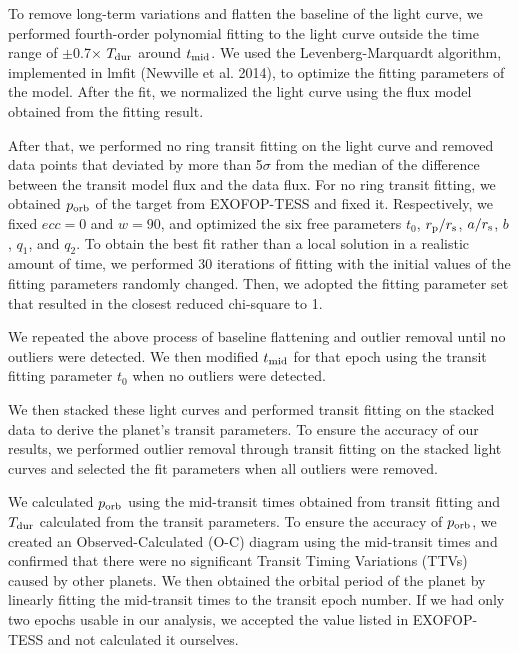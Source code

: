 \documentclass[fleqn,usenatbib, onecolumn,dvipdfmx]{mnras}
\begin{document}
To remove long-term variations and flatten the baseline of the light curve, we performed fourth-order polynomial fitting to the light curve outside the time range of $\pm$0.7× $T_{\rm{dur}}$ around $t_{\rm{mid}}$. We used the Levenberg-Marquardt algorithm, implemented in lmfit (Newville et al. 2014), to optimize the fitting parameters of the model. After the fit, we normalized the light curve using the flux model obtained from the fitting result.

After that, we performed no ring transit fitting on the light curve and removed data points that deviated by more than 5$\sigma$ from the median of the difference between the transit model flux and the data flux. 
For no ring transit fitting, we obtained $p_{\rm{orb}}$ of the target from EXOFOP-TESS and fixed it. Respectively, we fixed $ecc=0$ and $w=90$, and optimized the six free parameters $t_0$, $r_{\rm{p}}/r_{\rm{s}}$, $a/r_{\rm{s}}$, $b$, $q_1$, and $q_2$. To obtain the best fit rather than a local solution in a realistic amount of time, we performed 30 iterations of fitting with the initial values of the fitting parameters randomly changed. Then, we adopted the fitting parameter set that resulted in the closest reduced chi-square to 1.

We repeated the above process of baseline flattening and outlier removal until no outliers were detected. We then modified $t_{\rm{mid}}$ for that epoch using the transit fitting parameter $t_0$ when no outliers were detected.

We then stacked these light curves and performed transit fitting on the stacked data to derive the planet's transit parameters. To ensure the accuracy of our results, we performed outlier removal through transit fitting on the stacked light curves and selected the fit parameters when all outliers were removed.

We calculated $p_{\rm{orb}}$ using the mid-transit times obtained from transit fitting and $T_{\rm{dur}}$ calculated from the transit parameters. To ensure the accuracy of $p_{\rm{orb}}$, we created an Observed-Calculated (O-C) diagram using the mid-transit times and confirmed that there were no significant Transit Timing Variations (TTVs) caused by other planets. We then obtained the orbital period of the planet by linearly fitting the mid-transit times to the transit epoch number. If we had only two epochs usable in our analysis, we accepted the value listed in EXOFOP-TESS and not calculated it ourselves.
\end{document}
